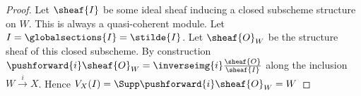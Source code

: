 \begin{proof}
Let $\sheaf{I}$ be some ideal sheaf inducing a closed subscheme structure on $W$.
This is always a quasi-coherent module.
Let $I = \globalsections{I} = \stilde{I}$.
Let $\sheaf{O}_W$ be the structure sheaf of this closed subscheme. 
By construction $\pushforward{i}\sheaf{O}_W  = {\inverseimg{i}}\frac{\sheaf{O}}{\sheaf{I}}$ 
along the inclusion $W\xrightarrow{i} X$.
Hence $V_X(I) = \Supp\pushforward{i}\sheaf{O}_W = W $
\end{proof}

